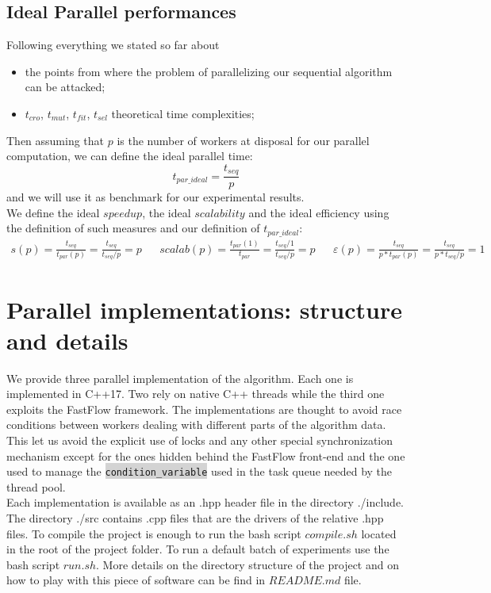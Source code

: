 \documentclass[11pt]{article}
\newcommand{\inlinecode}[2]{\colorbox{lightgray}{\lstinline[language=#1]$#2$}}
\begin{document}
\subsection{Ideal Parallel performances}
Following everything we stated so far about
\begin{itemize}
  \item the points from where the problem of parallelizing our sequential algorithm can be attacked;
  \item  $ t_{cro}$, $ t_{mut}$, $t_{fit}$, $t_{sel}$ theoretical time complexities;
\end{itemize} 
Then assuming that $ p $ is the number of workers at disposal for our parallel computation, we can define the ideal parallel time:
\[ t_{par\_ideal} = \frac{t_{seq}}{p} \]
and we will use it as benchmark for our experimental results.\\
We define the ideal $ speedup $, the ideal $ scalability $ and the ideal efficiency using the definition of such measures and our definition of $ t_{par\_ideal} $:
\begin{align*}
s(p) = \frac{t_{seq}}{t_{par}(p)} = \frac{t_{seq}}{t_{seq}/p} = p 
&
& scalab(p) = \frac{t_{par}(1)}{t_{par}} = \frac{t_{seq}/1}{t_{seq}/p} = p 
&
& \varepsilon(p) = \frac{t_{seq}}{p*t_{par}(p)} = \frac{t_{seq}}{p*t_{seq}/p} = 1 
\end{align*}



\section{Parallel implementations: structure and details}
We provide three parallel implementation of the algorithm. Each one is implemented in C++17. Two rely on native C++ threads while the third one exploits the FastFlow framework. The implementations are thought to avoid race conditions between workers dealing with different parts of the algorithm data. This let us avoid the explicit use of locks and any other special synchronization mechanism except for the ones hidden behind the FastFlow front-end and the one used to manage the \inlinecode{C++}{condition_variable} used in the task queue needed by the thread pool.\\
Each implementation is available as an .hpp header file in the directory ./include.
The directory ./src contains .cpp files that are the drivers of the relative .hpp files.
To compile the project is enough to run the bash script $ compile.sh $ located in the root of the project folder. To run a default batch of experiments use the bash script $ run.sh $. More details on the directory structure of the project and on how to play with this piece of software can be find in $ README.md $ file.
\end{document}
